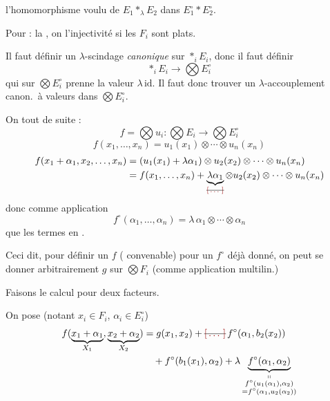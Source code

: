\documentclass[11pt,a4paper]{article}
\begin{document}
l'homomorphisme voulu de  $E_1 \mathbin{\ast_\lambda} E_2$ dans $E_1^{\circ} \ast E_2^{\circ}$.

Pour  : la  \ill{}, on  l'injectivité si les $F_i$ sont plats.

Il faut définir un $\lambda$-scindage \emph{canonique} sur $\mathop{\ast}_{i} E_i$, donc il faut définir
\[
  \mathop{\ast}_{i} E_i \longrightarrow \textstyle\bigotimes E_i^{\circ}
\]
qui sur $\bigotimes E_i^{\circ}$ prenne la valeur $\lambda\,\mathrm{id}$. Il faut donc trouver un $\lambda$-accouplement canon.\ à valeurs dans $\bigotimes E_i^{\circ}$.

On  tout de suite :
\[
  f = \textstyle\bigotimes u_i : \bigotimes E_i \longrightarrow \bigotimes E_i^{\circ}
\]
\[
  f(x_1, \ldots, x_n) = u_1(x_1) \otimes \cdots \otimes u_n(x_n)
\]
\begin{align*}
  f(x_1 + \alpha_1, x_2, \ldots, x_n) &= (u_1(x_1) + \lambda\alpha_1) \otimes u_2(x_2) \otimes \cdots \otimes u_n(x_n) \\
  &= f(x_1, \ldots, x_n) + \underbrace{\lambda\alpha_1}_{\text{\struck{\ill{}}}} \otimes u_2(x_2) \otimes \cdots \otimes u_n(x_n)
\end{align*}
 donc comme application
\[
  f^{\circ}(\alpha_1, \ldots, \alpha_n) = \lambda\, \alpha_1 \otimes \cdots \otimes \alpha_n
\]
\ill{} que les termes en \ill{} .

Ceci dit, pour définir un  $f$ (\struck{\ill{}} convenable) pour un $f^{\circ}$ déjà donné, on peut se donner arbitrairement $g$  sur $\bigotimes F_i$ (comme application multilin.)

 Faisons le calcul pour deux facteurs.

On pose (notant $x_i \in F_i$, $\alpha_i \in E_i^{\circ}$)
\begin{align*}
  f(\underbrace{x_1 + \alpha_1}_{X_1}, \underbrace{x_2 + \alpha_2}_{X_2})
  &= g(x_1, x_2) + \text{\struck{\ill{}}}\, f^{\circ}(\alpha_1, b_2(x_2)) \\
  &\quad + f^{\circ}(b_1(x_1), \alpha_2) + \lambda \underbrace{f^{\circ}(\alpha_1, \alpha_2)}_{\substack{\shortparallel \\ f^{\circ}(u_1(\alpha_1), \alpha_2) \\ = f^{\circ}(\alpha_1, u_2(\alpha_2))}}
\end{align*}
\end{document}
